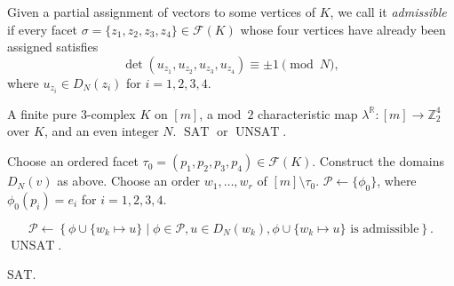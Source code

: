 \documentclass{amsart}
\newcommand{\Z}{\mathbb{Z}}
\newcommand{\R}{\mathbb{R}}
\newcommand{\cF}{\mathcal{F}}
\newcommand{\cP}{\mathcal{P}}
\DeclareMathOperator{\SAT}{SAT}
\DeclareMathOperator{\UNSAT}{UNSAT}
\theoremstyle{definition}
\theoremstyle{remark}
\begin{document}
Given a partial assignment of vectors to some vertices of $K$, we call it \emph{admissible} if every facet $\sigma=\{z_1,z_2,z_3,z_4\}\in \cF(K)$ whose four vertices have already been assigned satisfies
$$
    \det(u_{z_1},u_{z_2},u_{z_3},u_{z_4}) \equiv \pm1\pmod N,
$$
where $u_{z_i}\in D_N(z_i)$ for $i = 1, 2, 3, 4$.
\begin{algorithm}[t]
\caption{Finite congruence obstruction test} \label{alg:finite-congruence-obstruction}
\begin{algorithmic}[1]
    \Require A finite pure $3$-complex $K$ on $[m]$, a mod~$2$ characteristic map
    $\lambda^\R \colon [m] \to\Z_2^4$ over $K$, and an even integer $N$.
    \Ensure $\SAT$ or $\UNSAT$.
    
    \State Choose an ordered facet $\tau_0=(p_1,p_2,p_3,p_4)\in \cF(K)$.
    \State Construct the domains $D_N(v)$ as above.
    \State Choose an order $w_1,\ldots,w_r$ of $[m] \setminus\tau_0$.
    \State $\cP\gets\{\phi_0\}$, where $\phi_0(p_i)=e_i$ for $i=1,2,3,4$.
    
        \State
        $$
            \cP\gets  \left\{ \phi\cup\{w_k\mapsto u\} \middle| \phi\in\cP, u\in D_N(w_k), \phi\cup\{w_k\mapsto u\}\text{ is admissible} \right\}.
        $$
        \If{$\cP=\varnothing$}
            \State \Return $\UNSAT$.
        \EndIf
    \EndFor
    
    \State \Return $\mathrm{SAT}$.
\end{algorithmic}
\end{algorithm}
\end{document}
